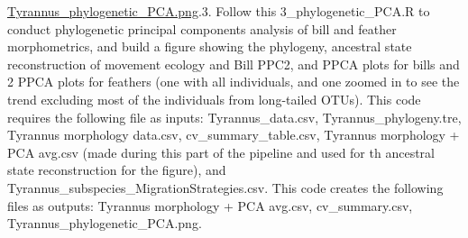 \documentclass[]{article}
\begin{document}
{{\href{https://github.com/mmacphe/Tyrannus_morphology/blob/main/Output\%20Files/Tyrannus_phylogenetic_PCA.png}{Tyrannus\_phylogenetic\_PCA.png}.}{3. Follow this 3\_phylogenetic\_PCA.R to conduct phylogenetic principal components analysis of bill and feather morphometrics, and build a figure showing the phylogeny, ancestral state reconstruction of movement ecology and Bill PPC2, and PPCA plots for bills and 2 PPCA plots for feathers (one with all individuals, and one zoomed in to see the trend excluding most of the individuals from long-tailed OTUs). This code requires the following file as inputs: Tyrannus\_data.csv, Tyrannus\_phylogeny.tre, Tyrannus morphology data.csv, cv\_summary\_table.csv, Tyrannus morphology + PCA avg.csv (made during this part of the pipeline and used for th ancestral state reconstruction for the figure), and Tyrannus\_subspecies\_MigrationStrategies.csv. This code creates the following files as outputs: Tyrannus morphology + PCA avg.csv, cv\_summary.csv, Tyrannus\_phylogenetic\_PCA.png.}}\label{follow-this-3_phylogenetic_pca.r-to-conduct-phylogenetic-principal-components-analysis-of-bill-and-feather-morphometrics-and-build-a-figure-showing-the-phylogeny-ancestral-state-reconstruction-of-movement-ecology-and-bill-ppc2-and-ppca-plots-for-bills-and-2-ppca-plots-for-feathers-one-with-all-individuals-and-one-zoomed-in-to-see-the-trend-excluding-most-of-the-individuals-from-long-tailed-otus.-this-code-requires-the-following-file-as-inputs-tyrannus_data.csv-tyrannus_phylogeny.tre-tyrannus-morphology-data.csv-cv_summary_table.csv-tyrannus-morphology-pca-avg.csv-made-during-this-part-of-the-pipeline-and-used-for-th-ancestral-state-reconstruction-for-the-figure-and-tyrannus_subspecies_migrationstrategies.csv.-this-code-creates-the-following-files-as-outputs-tyrannus-morphology-pca-avg.csv-cv_summary.csv-tyrannus_phylogenetic_pca.png.}
\end{document}
